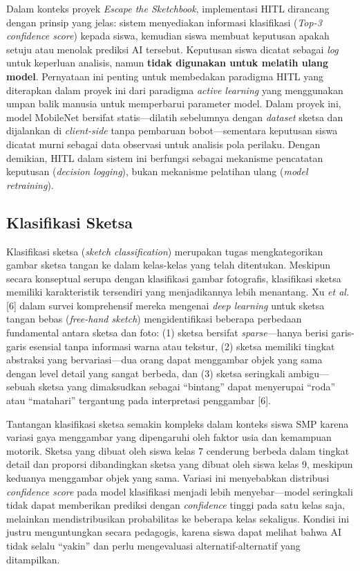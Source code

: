 \documentclass[10pt,twoside,openright]{report}
\begin{document}
Dalam konteks proyek \textit{Escape the Sketchbook}, implementasi HITL dirancang dengan prinsip yang jelas: sistem menyediakan informasi klasifikasi (\textit{Top-3 confidence score}) kepada siswa, kemudian siswa membuat keputusan apakah setuju atau menolak prediksi AI tersebut. Keputusan siswa dicatat sebagai \textit{log} untuk keperluan analisis, namun \textbf{tidak digunakan untuk melatih ulang model}. Pernyataan ini penting untuk membedakan paradigma HITL yang diterapkan dalam proyek ini dari paradigma \textit{active learning} yang menggunakan umpan balik manusia untuk memperbarui parameter model. Dalam proyek ini, model MobileNet bersifat statis—dilatih sebelumnya dengan \textit{dataset} sketsa dan dijalankan di \textit{client-side} tanpa pembaruan bobot—sementara keputusan siswa dicatat murni sebagai data observasi untuk analisis pola perilaku. Dengan demikian, HITL dalam sistem ini berfungsi sebagai mekanisme pencatatan keputusan (\textit{decision logging}), bukan mekanisme pelatihan ulang (\textit{model retraining}).

\subsection{Klasifikasi Sketsa}
\label{subsec:klasifikasi-sketsa}

Klasifikasi sketsa (\textit{sketch classification}) merupakan tugas mengkategorikan gambar sketsa tangan ke dalam kelas-kelas yang telah ditentukan. Meskipun secara konseptual serupa dengan klasifikasi gambar fotografis, klasifikasi sketsa memiliki karakteristik tersendiri yang menjadikannya lebih menantang. Xu \textit{et al.} [6] dalam survei komprehensif mereka mengenai \textit{deep learning} untuk sketsa tangan bebas (\textit{free-hand sketch}) mengidentifikasi beberapa perbedaan fundamental antara sketsa dan foto: (1) sketsa bersifat \textit{sparse}—hanya berisi garis-garis esensial tanpa informasi warna atau tekstur, (2) sketsa memiliki tingkat abstraksi yang bervariasi—dua orang dapat menggambar objek yang sama dengan level detail yang sangat berbeda, dan (3) sketsa seringkali ambigu—sebuah sketsa yang dimaksudkan sebagai ``bintang'' dapat menyerupai ``roda'' atau ``matahari'' tergantung pada interpretasi penggambar [6].

Tantangan klasifikasi sketsa semakin kompleks dalam konteks siswa SMP karena variasi gaya menggambar yang dipengaruhi oleh faktor usia dan kemampuan motorik. Sketsa yang dibuat oleh siswa kelas 7 cenderung berbeda dalam tingkat detail dan proporsi dibandingkan sketsa yang dibuat oleh siswa kelas 9, meskipun keduanya menggambar objek yang sama. Variasi ini menyebabkan distribusi \textit{confidence score} pada model klasifikasi menjadi lebih menyebar—model seringkali tidak dapat memberikan prediksi dengan \textit{confidence} tinggi pada satu kelas saja, melainkan mendistribusikan probabilitas ke beberapa kelas sekaligus. Kondisi ini justru menguntungkan secara pedagogis, karena siswa dapat melihat bahwa AI tidak selalu ``yakin'' dan perlu mengevaluasi alternatif-alternatif yang ditampilkan.
\end{document}
